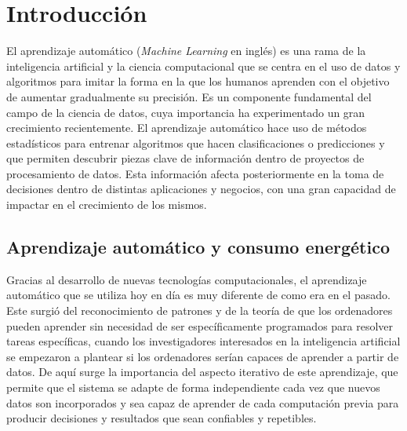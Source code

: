 \chapter{Introducción}
\label{sec:intro}





El aprendizaje automático (\emph{Machine Learning} en inglés) es una rama de la inteligencia artificial y la ciencia computacional que se centra en el uso de datos y algoritmos para imitar la forma en la que los humanos aprenden con el objetivo de aumentar gradualmente su precisión.
Es un componente fundamental del campo de la ciencia de datos, cuya importancia ha experimentado un gran crecimiento recientemente. 
El aprendizaje automático hace uso de métodos estadísticos para entrenar algoritmos que hacen clasificaciones o predicciones y que permiten descubrir piezas clave de información dentro de proyectos de procesamiento de datos. 
Esta información afecta posteriormente en la toma de decisiones dentro de distintas aplicaciones y negocios, con una gran capacidad de impactar en el crecimiento de los mismos.

\section{Aprendizaje automático y consumo energético}

Gracias al desarrollo de nuevas tecnologías computacionales, el aprendizaje automático que se utiliza hoy en día es muy diferente de como era en el pasado.
Este surgió del reconocimiento de patrones y de la teoría de que los ordenadores pueden aprender sin necesidad de ser específicamente programados para resolver tareas específicas, cuando los investigadores interesados en la inteligencia artificial se empezaron a plantear si los ordenadores serían capaces de aprender a partir de datos.
De aquí surge la importancia del aspecto iterativo de este aprendizaje, que permite que el sistema se adapte de forma independiente cada vez que nuevos datos son incorporados y sea capaz de aprender de cada computación previa para producir decisiones y resultados que sean confiables y repetibles.

